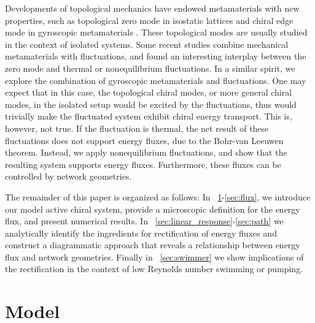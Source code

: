 \documentclass[
 preprint,
 preprintnumbers,
 amsmath,amssymb,
 aps,
 pre,
 longbibliography,
 superscriptaddress,
 10pt, twocolumn
]{revtex4-1}
\begin{document}
Developments of topological mechanics have endowed metamaterials with new properties, such as topological zero mode in isostatic lattices \cite{Kane2013TopologicalBoundary} and chiral edge mode in gyroscopic metamaterials \cite{Nash2015TopologicalMechanics,Wang2015TopologicalPhononic,Mitchell2018AmorphousTopological}.
These topological modes are usually studied in the context of isolated systems.
Some recent studies combine mechanical metamaterials with fluctuations, and found an interesting interplay between the zero mode and thermal \cite{Rocklin2018FoldingMechanismsa} or nonequilibrium \cite{Woodhouse2018AutonomousActuation} fluctuations.
In a similar spirit, we explore the combination of gyroscopic metamaterials \cite{Nash2015TopologicalMechanics} and fluctuations.
One may expect that in this case, the topological chiral modes, or more general chiral modes, in the isolated setup would be excited by the fluctuations, thus would trivially make the fluctuated system exhibit chiral energy transport. This is, however, not true.
If the fluctuation is thermal, the net result of these fluctuations does not support energy fluxes, due to the Bohr-van Leeuwen theorem.
Instead, we apply nonequilibrium fluctuations, and show that the resulting system supports energy fluxes. Furthermore, these fluxes can be controlled by network geometries.




The remainder of this paper is organized as follows:
In \secname~\ref{sec:model}-\ref{sec:flux}, we introduce our model active chiral system, provide a microscopic definition for the energy flux, and present numerical results.
In \secname~\ref{sec:linear_response}-\ref{sec:path} we analytically identify the ingredients for rectification of energy fluxes and construct a diagrammatic approach that reveals a relationship between energy flux and network geometries.
Finally in \secname~\ref{sec:swimmer} we show implications of the rectification in the context of low Reynolds number swimming or pumping.

\section{Model} \label{sec:model}
\end{document}

